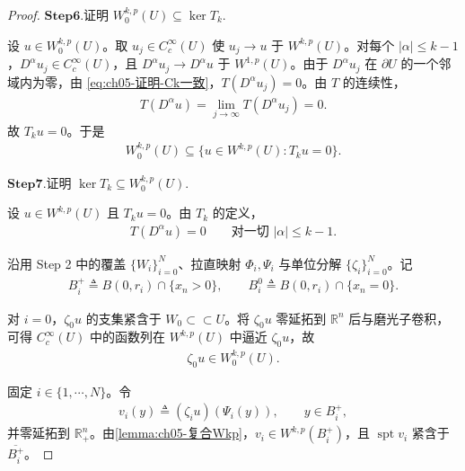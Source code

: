 \documentclass[../../main.tex]{subfiles}%
\begin{document}
\begin{proof}
\noindent$\mathbf{Step}\mathbf{6}.${\heiti 证明 $W^{k,p}_{0}(U)\subseteq\ker T_{k}$.}

设 $u\in W^{k,p}_{0}(U)$。取 $u_{j}\in C^{\infty}_{c}(U)$ 使 $u_{j}\to u$ 于 $W^{k,p}(U)$。对每个 $|\alpha|\leqslant k-1$，$D^{\alpha}u_{j}\in C^{\infty}_{c}(U)$，且 $D^{\alpha}u_{j}\to D^{\alpha}u$ 于 $W^{1,p}(U)$。由于 $D^{\alpha}u_{j}$ 在 $\partial U$ 的一个邻域内为零，由 \eqref{eq:ch05-证明-Ck一致}，$T(D^{\alpha}u_{j})=0$。由 $T$ 的连续性，
\begin{align*}
T(D^{\alpha}u)=\lim_{j\to\infty}T(D^{\alpha}u_{j})=0.
\end{align*}
故 $T_{k}u=0$。于是
\begin{align}
W^{k,p}_{0}(U)\subseteq\{u\in W^{k,p}(U):T_{k}u=0\}.
\label{eq:ch05-证明-包含1}
\end{align}

\noindent$\mathbf{Step}\mathbf{7}.${\heiti 证明 $\ker T_{k}\subseteq W^{k,p}_{0}(U)$.}

设 $u\in W^{k,p}(U)$ 且 $T_{k}u=0$。由 $T_{k}$ 的定义，
\begin{align}
T(D^{\alpha}u)=0
\qquad\text{对一切 }|\alpha|\leqslant k-1.
\label{eq:ch05-证明-导数零迹}
\end{align}

沿用 Step 2 中的覆盖 $\{W_{i}\}_{i=0}^{N}$、拉直映射 $\Phi_{i},\Psi_{i}$ 与单位分解 $\{\zeta_{i}\}_{i=0}^{N}$。记
\begin{align*}
B_{i}^{+}\triangleq B(0,r_{i})\cap\{x_{n}>0\},
\qquad
B_{i}^{0}\triangleq B(0,r_{i})\cap\{x_{n}=0\}.
\end{align*}

对 $i=0$，$\zeta_{0}u$ 的支集紧含于 $W_{0}\subset\subset U$。将 $\zeta_{0}u$ 零延拓到 $\mathbb{R}^{n}$ 后与磨光子卷积，可得 $C^{\infty}_{c}(U)$ 中的函数列在 $W^{k,p}(U)$ 中逼近 $\zeta_{0}u$，故
\begin{align}
\zeta_{0}u\in W^{k,p}_{0}(U).
\label{eq:ch05-证明-i0}
\end{align}

固定 $i\in\{1,\cdots,N\}$。令
\begin{align*}
v_{i}(y)\triangleq(\zeta_{i}u)(\Psi_{i}(y)),
\qquad y\in B_{i}^{+},
\end{align*}
并零延拓到 $\mathbb{R}^{n}_{+}$。由\cref{lemma:ch05-复合Wkp}，$v_{i}\in W^{k,p}(B_{i}^{+})$，且 $\operatorname{spt}v_{i}$ 紧含于 $\overline{B_{i}^{+}}$。


\end{proof}
\end{document}
